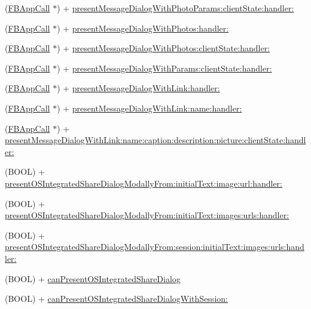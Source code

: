 \begin{DoxyCompactItemize}
(\hyperlink{interfaceFBAppCall}{F\+B\+App\+Call} $\ast$) + \hyperlink{interfaceFBDialogs_a4354b3266eb59fa77f04d88a4e6cda32}{present\+Message\+Dialog\+With\+Photo\+Params\+:client\+State\+:handler\+:}
\item 
(\hyperlink{interfaceFBAppCall}{F\+B\+App\+Call} $\ast$) + \hyperlink{interfaceFBDialogs_a47a8fb26e758e8b8da4843ce641a3fe6}{present\+Message\+Dialog\+With\+Photos\+:handler\+:}
\item 
(\hyperlink{interfaceFBAppCall}{F\+B\+App\+Call} $\ast$) + \hyperlink{interfaceFBDialogs_aa349cd5cb466439073782e084c422ca0}{present\+Message\+Dialog\+With\+Photos\+:client\+State\+:handler\+:}
\item 
(\hyperlink{interfaceFBAppCall}{F\+B\+App\+Call} $\ast$) + \hyperlink{interfaceFBDialogs_a09310f22ebc3ece7c91ee5bb47ccc4c6}{present\+Message\+Dialog\+With\+Params\+:client\+State\+:handler\+:}
\item 
(\hyperlink{interfaceFBAppCall}{F\+B\+App\+Call} $\ast$) + \hyperlink{interfaceFBDialogs_a33517c3089b65e7ce4c64c1c22c4e4af}{present\+Message\+Dialog\+With\+Link\+:handler\+:}
\item 
(\hyperlink{interfaceFBAppCall}{F\+B\+App\+Call} $\ast$) + \hyperlink{interfaceFBDialogs_ab32ff5073473c59f8ced776e087d5fe4}{present\+Message\+Dialog\+With\+Link\+:name\+:handler\+:}
\item 
(\hyperlink{interfaceFBAppCall}{F\+B\+App\+Call} $\ast$) + \hyperlink{interfaceFBDialogs_a6441b5e4b196ed9b32180aa14400c05a}{present\+Message\+Dialog\+With\+Link\+:name\+:caption\+:description\+:picture\+:client\+State\+:handler\+:}
\item 
(B\+O\+OL) + \hyperlink{interfaceFBDialogs_a872dc61b3ce463fea47eec224f8fb635}{present\+O\+S\+Integrated\+Share\+Dialog\+Modally\+From\+:initial\+Text\+:image\+:url\+:handler\+:}
\item 
(B\+O\+OL) + \hyperlink{interfaceFBDialogs_ac4ebf0c4beb5669aadce04ae3b8d8b2b}{present\+O\+S\+Integrated\+Share\+Dialog\+Modally\+From\+:initial\+Text\+:images\+:urls\+:handler\+:}
\item 
(B\+O\+OL) + \hyperlink{interfaceFBDialogs_a923876e895060843c9ee0ce0836f1a7a}{present\+O\+S\+Integrated\+Share\+Dialog\+Modally\+From\+:session\+:initial\+Text\+:images\+:urls\+:handler\+:}
\item 
(B\+O\+OL) + \hyperlink{interfaceFBDialogs_a4239a93d5d1b150b93cf589bca6f46e1}{can\+Present\+O\+S\+Integrated\+Share\+Dialog}
\item 
(B\+O\+OL) + \hyperlink{interfaceFBDialogs_a268b4ee8ee491e006770a51cefa36eeb}{can\+Present\+O\+S\+Integrated\+Share\+Dialog\+With\+Session\+:}

\end{DoxyCompactItemize}

